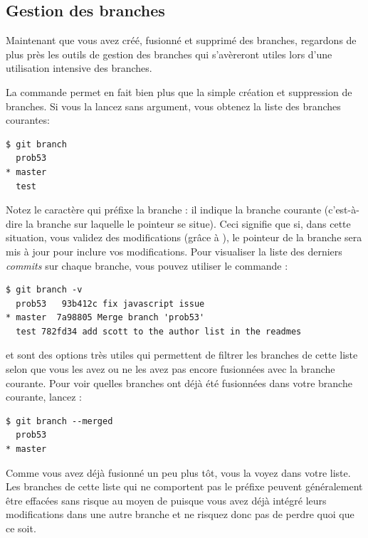 \subsection{Gestion des branches}
\label{sec:git:branch_management}

Maintenant que vous avez créé, fusionné et supprimé des branches, regardons de plus près les outils de gestion des branches qui s'avèreront utiles lors d'une utilisation intensive des branches.

La commande  permet en fait bien plus que la simple création et suppression de branches.
Si vous la lancez sans argument, vous obtenez la liste des branches courantes:
\begin{Schunk}
\begin{Verbatim}
$ git branch
  prob53
* master
  test
\end{Verbatim}
\end{Schunk}

Notez le caractère \code{*} qui préfixe la branche : il indique la branche courante (c'est-à-dire la branche sur laquelle le pointeur  se situe).
Ceci signifie que si, dans cette situation, vous validez des modifications (grâce à ), le pointeur de la branche  sera mis à jour pour inclure vos modifications.
Pour visualiser la liste des derniers \emph{commits} sur chaque branche, vous pouvez utiliser le commande :
\begin{Schunk}
\begin{Verbatim}
$ git branch -v
  prob53   93b412c fix javascript issue
* master  7a98805 Merge branch 'prob53'
  test 782fd34 add scott to the author list in the readmes
\end{Verbatim}
\end{Schunk}

 et  sont des options très utiles qui permettent de filtrer les branches de cette liste selon que vous les avez ou ne les avez pas encore fusionnées avec la branche courante.
Pour voir quelles branches ont déjà été fusionnées dans votre branche courante, lancez :
\begin{Schunk}
\begin{Verbatim}
$ git branch --merged
  prob53
* master
\end{Verbatim}
\end{Schunk}

Comme vous avez déjà fusionné  un peu plus tôt, vous la voyez dans votre liste.
Les branches de cette liste qui ne comportent pas le préfixe \code{*} peuvent généralement être effacées sans risque au moyen de  puisque vous avez déjà intégré leurs modifications dans une autre branche et ne risquez donc pas de perdre quoi que ce soit.


